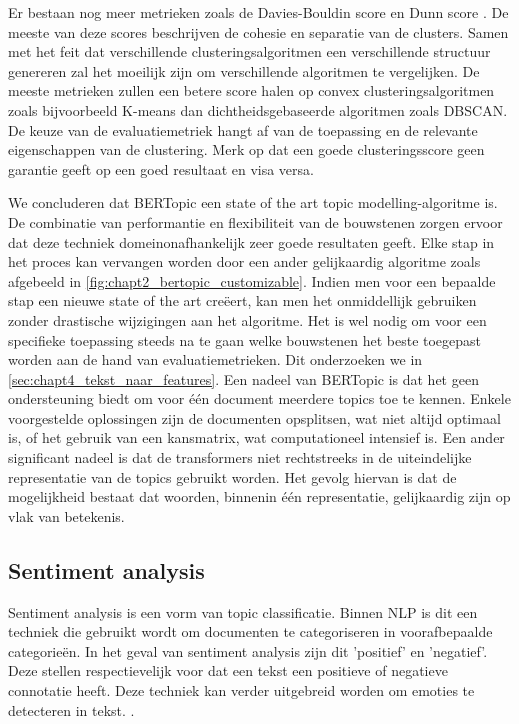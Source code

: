 Er bestaan nog meer metrieken zoals de Davies-Bouldin score \cite{davies_bouldin_paper} en Dunn score \cite{dunn_paper}. De meeste van deze scores beschrijven de cohesie en separatie van de clusters. Samen met het feit dat verschillende clusteringsalgoritmen een verschillende structuur genereren zal het moeilijk zijn om verschillende algoritmen te vergelijken. De meeste metrieken zullen een betere score halen op convex clusteringsalgoritmen zoals bijvoorbeeld K-means dan dichtheidsgebaseerde algoritmen zoals DBSCAN. \cite{eval_metrics_scikit} De keuze van de evaluatiemetriek hangt af van de toepassing en de relevante eigenschappen van de clustering. Merk op dat een goede clusteringsscore geen garantie geeft op een goed resultaat en visa versa.

We concluderen dat BERTopic een state of the art topic modelling-algoritme is. De combinatie van performantie en flexibiliteit van de bouwstenen zorgen ervoor dat deze techniek domeinonafhankelijk zeer goede resultaten geeft. Elke stap in het proces kan vervangen worden door een ander gelijkaardig algoritme zoals afgebeeld in \autoref{fig:chapt2_bertopic_customizable}. Indien men voor een bepaalde stap een nieuwe state of the art creëert, kan men het onmiddellijk gebruiken zonder drastische wijzigingen aan het algoritme. Het is wel nodig om voor een specifieke toepassing steeds na te gaan welke bouwstenen het beste toegepast worden aan de hand van evaluatiemetrieken. Dit onderzoeken we in \autoref{sec:chapt4_tekst_naar_features}. \newline
Een nadeel van BERTopic is dat het geen ondersteuning biedt om voor één document meerdere topics toe te kennen. Enkele voorgestelde oplossingen zijn de documenten opsplitsen, wat niet altijd optimaal is, of het gebruik van een kansmatrix, wat computationeel intensief is. Een ander significant nadeel is dat de transformers niet rechtstreeks in de uiteindelijke representatie van de topics gebruikt worden. Het gevolg hiervan is dat de mogelijkheid bestaat dat woorden, binnenin één representatie, gelijkaardig zijn op vlak van betekenis.


\subsection{Sentiment analysis}
Sentiment analysis is een vorm van topic classificatie. Binnen NLP is dit een techniek die gebruikt wordt om documenten te categoriseren in voorafbepaalde categorieën. In het geval van sentiment analysis zijn dit 'positief' en 'negatief'. Deze stellen respectievelijk voor dat een tekst een positieve of negatieve connotatie heeft. Deze techniek kan verder uitgebreid worden om emoties te detecteren in tekst. \cite{paper_emotions}.

